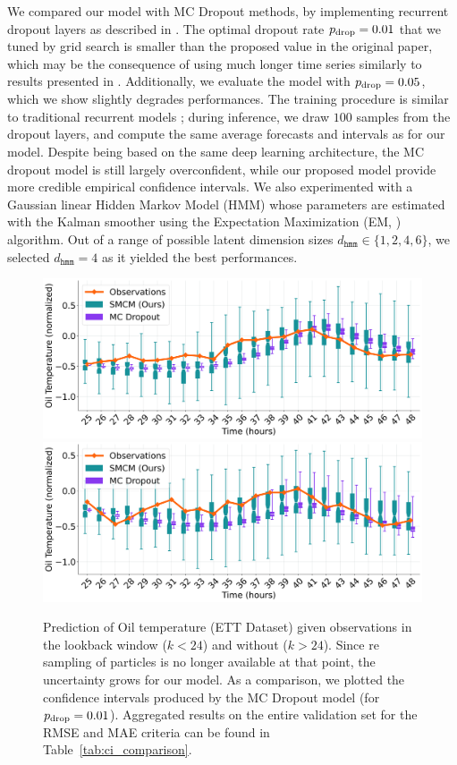 \documentclass[journal]{IEEEtran}
\begin{document}
We compared our model with MC Dropout methods, by implementing recurrent dropout layers as described in \cite{Gal2016NIPS}.
The optimal dropout rate $p_\textnormal{drop}=0.01$ that we tuned by grid search is smaller than the proposed value in the original paper, which may be the consequence of using much longer time series similarly to results presented in \cite{Zhu2017DeepAC}.
Additionally, we evaluate the model with $p_\textnormal{drop}=0.05$, which we show slightly degrades performances.
The training procedure is similar to traditional recurrent models ; during inference, we draw $100$ samples from the dropout layers, and compute the same average forecasts and  intervals as for our model.
Despite being based on the same deep learning architecture, the MC dropout model is still largely overconfident, while our proposed model provide more credible empirical confidence intervals.
We also experimented with a Gaussian linear Hidden Markov Model (HMM) whose parameters are estimated with the Kalman smoother using the Expectation Maximization (EM, \cite{Dempster77EM}) algorithm.
Out of a range of possible latent dimension sizes $d_{\texttt{hmm}} \in \{1, 2, 4, 6\}$, we selected $d_{\texttt{hmm}}=4$ as it yielded the best performances.

\begin{figure}[htpb]
	\centering
	\caption{Prediction of Oil temperature (ETT Dataset) given observations in the lookback window ($k<24$) and without ($k>24$).
		Since re sampling of particles is no longer available at that point, the uncertainty grows for our model.
		As a comparison, we plotted the confidence intervals produced by the MC Dropout model (for $p_\textnormal{drop}=0.01$).
		Aggregated results on the entire validation set for the RMSE and MAE criteria can be found in Table~\ref{tab:ci_comparison}.}
	\includegraphics[width=\linewidth]{filter_kp24_ett.png}
	\includegraphics[width=\linewidth]{filter_kp24_ett_2.png}
	\label{fig:filter_k+24}
\end{figure}
\end{document}
